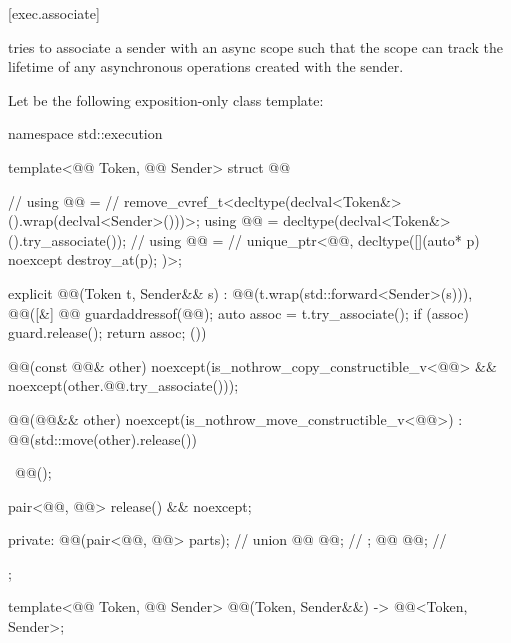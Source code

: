 [exec.associate]{}

\pnum
{} tries to associate
a sender with an async scope such that
the scope can track the lifetime of any asynchronous operations
created with the sender.

\pnum
Let  be the following exposition-only class template:

%
\begin{codeblock}
namespace std::execution {
  template<@@ Token, @@ Sender>
  struct @@ {                                               // \expos
    using @@ =                                                 // \expos
      remove_cvref_t<decltype(declval<Token&>().wrap(declval<Sender>()))>;
    using @@ = decltype(declval<Token&>().try_associate());        // \expos
    using @@ =                                                  // \expos
      unique_ptr<@@, decltype([](auto* p) noexcept { destroy_at(p); })>;

    explicit @@(Token t, Sender&& s)
      : @@(t.wrap(std::forward<Sender>(s))),
        @@([&] {
          @@ guard{addressof(@@)};
          auto assoc = t.try_associate();
          if (assoc) {
            guard.release();
          }
          return assoc;
        }()) {}

    @@(const @@& other)
      noexcept(is_nothrow_copy_constructible_v<@@> &&
               noexcept(other.@@.try_associate()));

    @@(@@&& other)
      noexcept(is_nothrow_move_constructible_v<@@>)
      : @@(std::move(other).release()) {}

    ~@@();

    pair<@@, @@> release() && noexcept;

  private:
    @@(pair<@@, @@> parts);                    // \expos
    union {
      @@ @@;                                                 // \expos
    };
    @@ @@;                                                      // \expos
  };

  template<@@ Token, @@ Sender>
    @@(Token, Sender&&) -> @@<Token, Sender>;
}
\end{codeblock}

